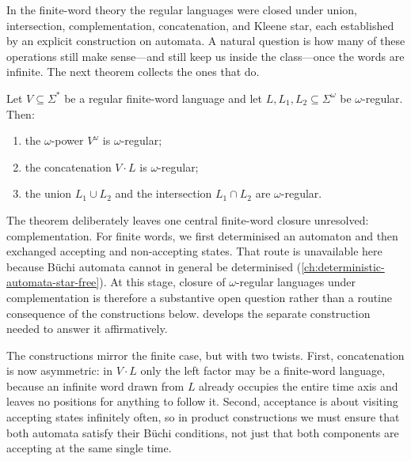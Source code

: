 In the finite-word theory the regular languages were closed under union,
intersection, complementation, concatenation, and Kleene star, each
established by an explicit construction on automata.  A natural question
is how many of these operations still make sense---and still keep us
inside the class---once the words are infinite.  The next theorem
collects the ones that do.

\begin{theorem}
\label{thm:omega-basic-closure}
Let $V\subseteq\Sigma^*$ be a regular finite-word language and let
$L,L_1,L_2\subseteq\Sigma^\omega$ be $\omega$-regular.  Then:
\begin{enumerate}[label=\textup{(\arabic*)}, nosep]
  \item the $\omega$-power $V^\omega$ is $\omega$-regular;
  \item the concatenation $V\cdot L$ is $\omega$-regular;
  \item the union $L_1\cup L_2$ and the intersection $L_1\cap L_2$ are
        $\omega$-regular.
\end{enumerate}
\end{theorem}

The theorem deliberately leaves one central finite-word closure unresolved:
complementation.  For finite words, we first determinised an automaton and
then exchanged accepting and non-accepting states.  That route is
unavailable here because B\"uchi automata cannot in general be determinised
(\cref{ch:deterministic-automata-star-free}).  At this stage, closure of
$\omega$-regular languages under complementation is therefore a substantive
open question rather than a routine consequence of the constructions
below.   develops the separate construction
needed to answer it affirmatively.

The constructions mirror the finite case, but with two twists.  First,
concatenation is now asymmetric: in $V\cdot L$ only the left factor may
be a finite-word language, because an infinite word drawn from $L$
already occupies the entire time axis and leaves no positions for
anything to follow it.  Second, acceptance is about visiting accepting
states infinitely often, so in product constructions we must ensure that
both automata satisfy their B\"uchi conditions, not just that both
components are accepting at the same single time.

